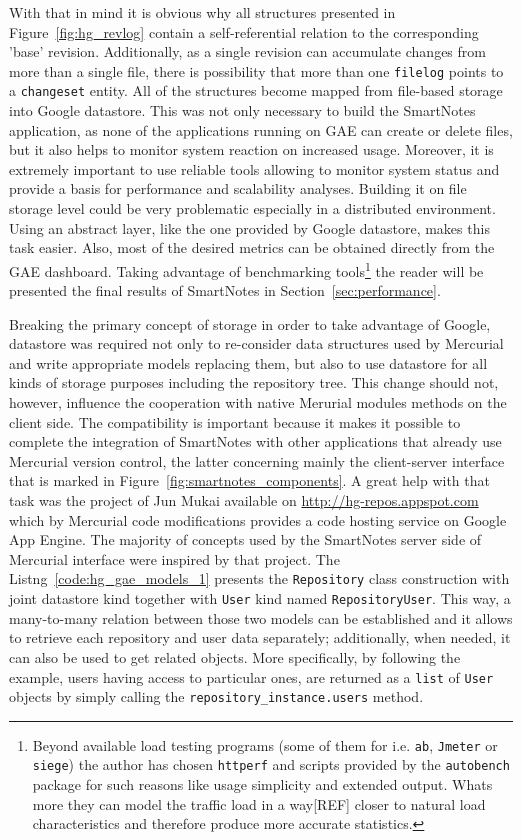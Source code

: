 With that in mind it is obvious why all structures presented in Figure~\ref{fig:hg_revlog} contain a self-referential relation to the corresponding 'base' revision. Additionally, as a single revision can accumulate changes from more than a single file, there is possibility that more than one \texttt{filelog} points to a \texttt{changeset} entity. All of the structures become mapped from file-based storage into Google datastore. This was not only necessary to build the SmartNotes application, as none of the applications running on GAE can create or delete files, but it also helps to monitor system reaction on increased usage. Moreover, it is extremely important to use reliable tools allowing to monitor system status and provide a basis for performance and scalability analyses. Building it on file storage level could be very problematic especially in a distributed environment. Using an abstract layer, like the one provided by Google datastore, makes this task easier. Also, most of the desired metrics can be obtained directly from the GAE dashboard. Taking advantage of benchmarking tools\footnote{Beyond available load testing programs (some of them for i.e. \texttt{ab}, \texttt{Jmeter} or \texttt{siege}) the author has chosen \texttt{httperf} and scripts provided by the \texttt{autobench} package for such reasons like usage simplicity and extended output. Whats more they can model  the traffic load in a way[REF] closer to natural load characteristics and therefore produce more accurate statistics.} the reader will be presented  the final results of SmartNotes in Section~\ref{sec:performance}.
 
Breaking the primary concept of storage in order to take advantage of Google, datastore was required not only to re-consider data structures used by Mercurial and write appropriate models replacing them, but also to use datastore for all kinds of storage purposes including the repository tree. This change should not, however, influence the cooperation with native Merurial modules methods on the client side. The compatibility is important because it makes it possible to complete the integration of SmartNotes with other applications that already use Mercurial version control, the latter concerning mainly the client-server interface that is marked in Figure~\ref{fig:smartnotes_components}. A great help with that task was the project of Jun Mukai available on \url{http://hg-repos.appspot.com} which by Mercurial code modifications provides a code hosting service on Google App Engine. The majority of concepts used by the SmartNotes server side of Mercurial interface were inspired by that project. The Listng~\ref{code:hg_gae_models_1} presents the \texttt{Repository} class construction with joint datastore kind together with \texttt{User} kind named \texttt{RepositoryUser}. This way, a many-to-many relation between those two models can be established and it allows to retrieve each repository and user data separately; additionally, when needed, it can also be used to get related objects. More specifically, by following the example, users having access to particular ones, are returned as a \texttt{list} of \texttt{User} objects by simply calling the \texttt{repository\_instance.users} method.\\  

